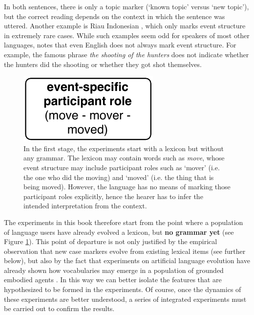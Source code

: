 In both sentences, there is only a topic marker (`known topic' versus `new topic'), but the correct reading depends on the context in which the sentence was uttered. Another example is Riau Indonesian \citep{gil08how}, which only marks event structure in extremely rare cases. While such examples seem odd for speakers of most other languages, \citet[23]{palmer94grammatical} notes that even English does not always mark event structure. For example, the famous phrase {\em the shooting of the hunters} does not indicate whether the hunters did the shooting or whether they got shot themselves.

\begin{figure}[t]
\centerline{\includegraphics[scale=0.6]{chap-introduction/figs/stage1}}
    \caption[Formation of case markers: stage II]{In the first stage, the experiments start with a lexicon but without any grammar. The lexicon may contain words such as {\em move}, whose event structure may include participant roles such as `mover' (i.e. the one who did the moving) and `moved' (i.e. the thing that is being moved). However, the language has no means of marking those participant roles explicitly, hence the hearer has to infer the intended interpretation from the context.}
      \label{f:stage1}
\end{figure}

The experiments in this book therefore start from the point where a population of language users have already evolved a lexicon, but {\bfseries no grammar yet} (see Figure \ref{f:stage1}). This point of departure is not only justified by the empirical observation that new case markers evolve from existing lexical items (see further below), but also by the fact that experiments on artificial language evolution have already shown how vocabularies may emerge in a population of grounded embodied agents \citep[e.g.][]{steels96emergent, steels96selforganizing, steels97selforganizing}. In this way we can better isolate the features that are hypothesized to be formed in the experiments. Of course, once the dynamics of these experiments are better understood, a series of integrated experiments must be carried out to confirm the results.

